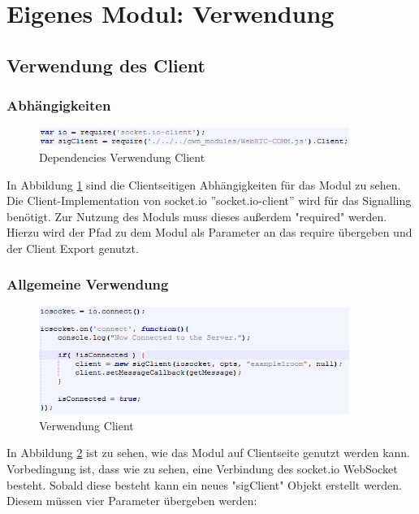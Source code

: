 \section{Eigenes Modul: Verwendung}

\subsection{Verwendung des Client}

\subsubsection{Abhängigkeiten}
\begin{figure}[htH]
\centering
\includegraphics[width=0.9\textwidth]{backend/Modul_UserClientDependencies.PNG}
\caption{Dependencies Verwendung Client}
\label{backfig10}
\end{figure}
In Abbildung \ref{backfig10} sind die Clientseitigen Abhängigkeiten für das Modul zu sehen.
Die Client-Implementation von socket.io ''socket.io-client'' wird für das Signalling benötigt.
Zur Nutzung des Moduls muss dieses außerdem "required" werden. Hierzu wird der Pfad zu dem Modul als Parameter an das require übergeben und der Client Export genutzt.



\subsubsection{Allgemeine Verwendung}
\begin{figure}[htH]
\centering
\includegraphics[width=0.9\textwidth]{backend/Modul_UserClientHowTo.PNG}
\caption{Verwendung Client}
\label{backfig11}
\end{figure}
In Abbildung \ref{backfig11} ist zu sehen, wie das Modul auf Clientseite genutzt werden kann.
Vorbedingung ist, dass wie zu sehen, eine Verbindung des socket.io WebSocket besteht.
Sobald diese besteht kann ein neues "sigClient" Objekt erstellt werden.
Diesem müssen vier Parameter übergeben werden:

